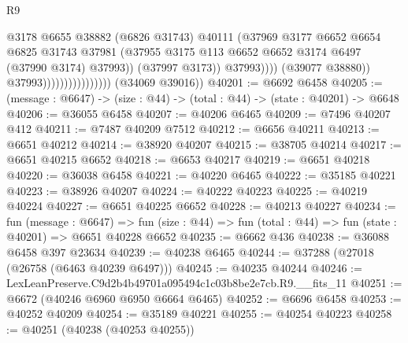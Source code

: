 \begin{lexlean}{R9}
\begin{coremodule}
                                                  @3178
                                                  @6655
                                                  @38882
                                                  (@6826 @31743)
                                                  @40111
                                                  (@37969
                                                    @3177
                                                    @6652
                                                    @6654
                                                    @6825
                                                    @31743
                                                    @37981
                                                    (@37955
                                                      @3175
                                                      @113
                                                      @6652
                                                      @6652
                                                      @3174
                                                      @6497
                                                      (@37990 @3174)
                                                      @37993))
                                                  (@37997 @3173))
                                                @37993))))
                                        (@39077 @38880))
                                      @37993))))))))))))))))
      (@34069 @39016))
@40201 := @6692 @6458
@40205 := (message : @6647) -> (size : @44) -> (total : @44) -> (state : @40201) -> @6648
@40206 := @36055 @6458
@40207 := @40206 @6465
@40209 := @7496 @40207 @412
@40211 := @7487 @40209 @7512
@40212 := @6656 @40211
@40213 := @6651 @40212
@40214 := @38920 @40207
@40215 := @38705 @40214
@40217 := @6651 @40215 @6652
@40218 := @6653 @40217
@40219 := @6651 @40218
@40220 := @36038 @6458
@40221 := @40220 @6465
@40222 := @35185 @40221
@40223 := @38926 @40207
@40224 := @40222 @40223
@40225 := @40219 @40224
@40227 := @6651 @40225 @6652
@40228 := @40213 @40227
@40234 := fun (message : @6647) =>
  fun (size : @44) => fun (total : @44) => fun (state : @40201) => @6651 @40228 @6652
@40235 := @6662 @436
@40238 := @36088 @6458 @397 @23634
@40239 := @40238 @6465
@40244 := @37288 (@27018 (@26758 (@6463 @40239 @6497)))
@40245 := @40235 @40244
@40246 := LexLeanPreserve.C9d2b4b49701a095494c1c03b8be2e7cb.R9.__fits_11
@40251 := @6672 (@40246 @6960 @6950 @6664 @6465)
@40252 := @6696 @6458
@40253 := @40252 @40209
@40254 := @35189 @40221
@40255 := @40254 @40223
@40258 := @40251 (@40238 (@40253 @40255))

\end{coremodule}
\end{lexlean}
